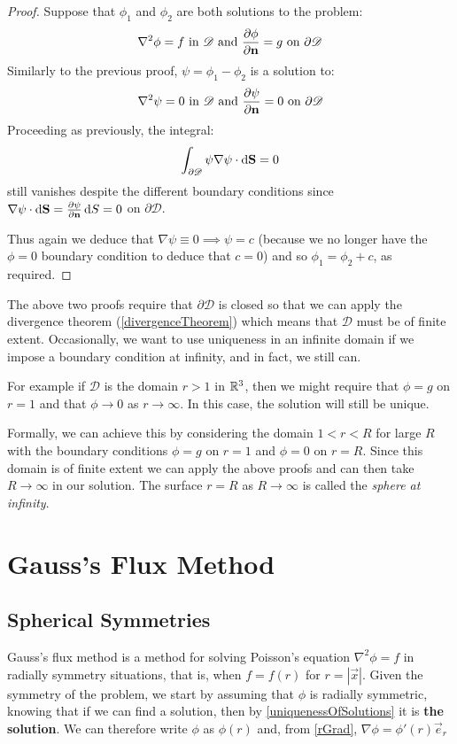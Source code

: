 \documentclass[../main.tex]{subfiles}
\begin{document}
\begin{proof}
  Suppose that $\phi_1$ and $\phi_2$ are both solutions to the problem:
  \[
    \nabla^2 \phi = f \text{ in } \mathscr{D} \text{ and } \pderiv{\phi}{\vec{n}} = g \text{ on } \partial\mathscr{D}
  \]
  Similarly to the previous proof, $\psi = \phi_1 - \phi_2$ is a solution to:
  \[
    \nabla^2 \psi = 0 \text{ in } \mathscr{D} \text{ and } \pderiv{\psi}{\vec{n}} = 0 \text{ on } \partial\mathscr{D}
  \]
  Proceeding as previously, the integral:
  \[
    \int_{\partial \mathscr{D}} \psi \nabla \psi \cdot \d{\vec{S}} = 0
  \]
  still vanishes despite the different boundary conditions since $\nabla \psi \cdot \d{\vec{S}} = \pderiv{\psi}{\vec{n}} \d{S} = 0$ on $\partial \mathscr{D}$.

  Thus again we deduce that $\nabla \psi \equiv 0 \implies \psi = c$ (because we no longer have the $\phi = 0$ boundary condition to deduce that $c = 0$) and so $\phi_1 = \phi_2 + c$, as required.
\end{proof}
\begin{remark}
  The above two proofs require that $\partial \mathscr{D}$ is closed so that we can apply the divergence theorem (\cref{divergenceTheorem}) which means that $\mathscr{D}$ must be of finite extent.
  Occasionally, we want to use uniqueness in an infinite domain if we impose a boundary condition at infinity, and in fact, we still can.

  For example if $\mathscr{D}$ is the domain $r > 1$ in $\mathbb{R}^3$, then we might require that $\phi = g$ on $r = 1$ and that $\phi \to 0$ as $r \to \infty$.
  In this case, the solution will still be unique.

  \nonexaminable
  Formally, we can achieve this by considering the domain $1 < r < R$ for large $R$ with the boundary conditions $\phi = g$ on $r = 1$ and $\phi = 0$ on $r = R$.
  Since this domain is of finite extent we can apply the above proofs and can then take $R \to \infty$ in our solution.
  The surface $r = R$ as $R \to \infty$ is called the \textit{sphere at infinity}.
\end{remark}
\section{Gauss's Flux Method}
\subsection{Spherical Symmetries}
\label{gaussFluxSpherical}
Gauss's flux method is a method for solving Poisson's equation $\nabla^2 \phi = f$ in radially symmetry situations, that is, when $f = f(r)$ for $r = |\vec{x}|$.
Given the symmetry of the problem, we start by assuming that $\phi$ is radially symmetric, knowing that if we can find a solution, then by \cref{uniquenessOfSolutions} it is \textbf{the solution}.
We can therefore write $\phi$ as $\phi(r)$ and, from \cref{rGrad}, $\nabla \phi = \phi'(r)\vec{e}_r$
\end{document}
